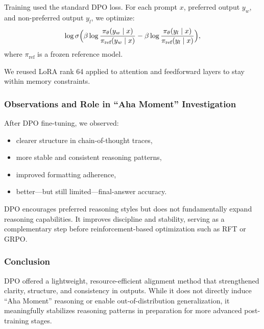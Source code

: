 \documentclass{article}
\begin{document}
Training used the standard DPO loss. For each prompt $x$, preferred output $y_w$, and non-preferred output $y_l$, we optimize:
\[
\log \sigma\Bigl(
\beta \log \frac{\pi_\theta(y_w \mid x)}{\pi_{\text{ref}}(y_w \mid x)}
-
\beta \log \frac{\pi_\theta(y_l \mid x)}{\pi_{\text{ref}}(y_l \mid x)}
\Bigr),
\]
where $\pi_{\text{ref}}$ is a frozen reference model.

We reused LoRA rank 64 applied to attention and feedforward layers to stay within memory constraints.

\subsubsection*{Observations and Role in ``Aha Moment'' Investigation}

After DPO fine-tuning, we observed:
\begin{itemize}
    \item clearer structure in chain-of-thought traces,
    \item more stable and consistent reasoning patterns,
    \item improved formatting adherence,
    \item better---but still limited---final-answer accuracy.
\end{itemize}

DPO encourages preferred reasoning styles but does not fundamentally expand reasoning capabilities. It improves discipline and stability, serving as a complementary step before reinforcement-based optimization such as RFT or GRPO.

\subsubsection*{Conclusion}

DPO offered a lightweight, resource-efficient alignment method that strengthened clarity, structure, and consistency in outputs. While it does not directly induce ``Aha Moment'' reasoning or enable out-of-distribution generalization, it meaningfully stabilizes reasoning patterns in preparation for more advanced post-training stages.
\end{document}
